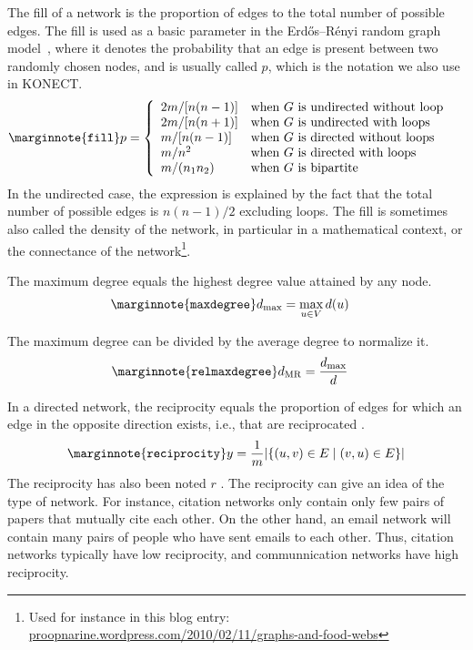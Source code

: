 \documentclass{article}
\begin{document}
The fill of a network is the proportion of edges to the total
number of possible edges. 
The fill is used as a basic parameter in the Erdős--Rényi random graph
model~\cite{b569}, where it denotes the probability that an edge is present between
two randomly chosen nodes, and is usually called $p$, which is the
notation we also use in KONECT. 
\begin{align}
  \marginnote{\texttt{fill}}
  p &= \left\{ \begin{array}{ll}
    2m / [n(n-1)] & \text{when $G$ is undirected without loop} \\
    2m / [n(n+1)] & \text{when $G$ is undirected with loops} \\
    m / [n(n-1)] & \text{when $G$ is directed without loops} \\
    m / n^2 & \text{when $G$ is directed with loops} \\
    m / (n_1 n_2) & \text{when $G$ is bipartite} 
  \end{array}\right. 
\end{align}
In the undirected case, the expression is explained by the fact that the
total number of possible edges is $n(n-1)/2$ excluding loops.  
The fill is sometimes also called the density of the network, in
particular in a mathematical context, or the connectance of the
network\footnote{Used for instance in this blog entry:  \href{https://proopnarine.wordpress.com/2010/02/11/graphs-and-food-webs/}{proopnarine.wordpress.com/2010/02/11/graphs-and-food-webs}}. 

The maximum degree equals the highest degree value attained
by any node.
\begin{align}
  \marginnote{\texttt{maxdegree}}
  d_{\max} &= \max_{u\in V} d(u)
\end{align}

The maximum degree can be divided by the average degree to normalize it.
\begin{align}
  \marginnote{\texttt{relmaxdegree}}
  d_{\mathrm{MR}} &= \frac {d_{\max}} {d}
\end{align}

In a directed network, the reciprocity equals the proportion of edges
for which an edge in the opposite direction exists, i.e., that are
reciprocated \cite{b866}.  
\begin{align}
  \marginnote{\texttt{reciprocity}}
  y = \frac 1 m  | \{ (u,v) \in E \mid (v,u) \in E \} | 
\end{align}
The reciprocity has also been noted $r$ \cite{b867}. 
The reciprocity can give an idea of the type of network.  For instance,
citation networks only contain only few pairs of papers that mutually
cite each other.  On the other hand, an email network will contain many
pairs of people who have sent emails to each other.  Thus, citation
networks typically have low reciprocity, and communnication networks
have high reciprocity. 
\end{document}
